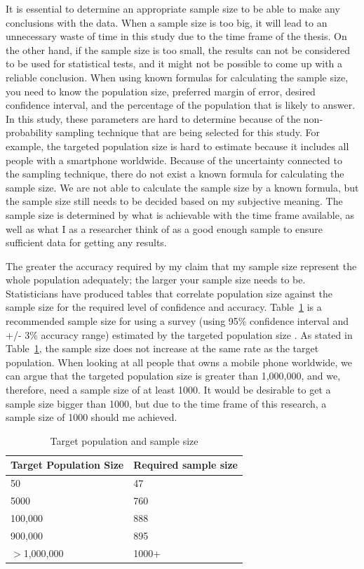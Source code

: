     It is essential to determine an appropriate sample size to be able to make any conclusions with the data. When a sample size is too big, it will lead to an unnecessary waste of time in this study due to the time frame of the thesis. On the other hand, if the sample size is too small, the results can not be considered to be used for statistical tests, and it might not be possible to come up with a reliable conclusion. When using known formulas for calculating the sample size, you need to know the population size, preferred margin of error, desired confidence interval, and the percentage of the population that is likely to answer. In this study, these parameters are hard to determine because of the non-probability sampling technique that are being selected for this study. For example, the targeted population size is hard to estimate because it includes all people with a smartphone worldwide. Because of the uncertainty connected to the sampling technique, there do not exist a known formula for calculating the sample size. We are not able to calculate the sample size by a known formula, but the sample size still needs to be decided based on my subjective meaning. The sample size is determined by what is achievable with the time frame available, as well as what I as a researcher think of as a good enough sample to ensure sufficient data for getting any results.

    The greater the accuracy required by my claim that my sample size represent the whole population adequately; the larger your sample size needs to be. Statisticians have produced tables that correlate population size against the sample size for the required level of confidence and accuracy. Table~\ref{tab:sampleSize} is a recommended sample size for using a survey (using 95\% confidence interval and +/- 3\% accuracy range) estimated by the targeted population size \cite{empiriske}. As stated in Table~\ref{tab:sampleSize}, the sample size does not increase at the same rate as the target population. When looking at all people that owns a mobile phone worldwide, we can argue that the targeted population size is greater than 1,000,000, and we, therefore, need a sample size of at least 1000. It would be desirable to get a sample size bigger than 1000, but due to the time frame of this research, a sample size of 1000 should me achieved.

      \begin{table}[H]
        \centering
        \begin{tabular}{| p{5cm} | p{5cm} |}
          \hline
          {\bf Target Population Size} & {\bf Required sample size} \\ \hline
          50 & 47 \\
          5000 & 760 \\ 
          100,000 & 888 \\
          900,000 & 895 \\ 
          $>$1,000,000 & 1000+ \\ \hline
        \end{tabular}
        \caption{Target population and sample size \cite{empiriske}}
        \label{tab:sampleSize}
      \end{table}

